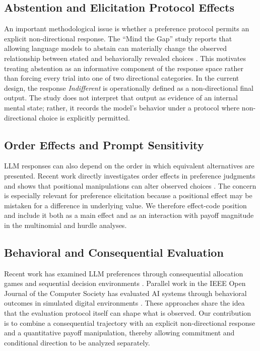 \documentclass[10pt,journal,compsoc]{IEEEtran}
\begin{document}
\subsection{Abstention and Elicitation Protocol Effects}
An important methodological issue is whether a preference protocol permits an explicit non-directional response. The ``Mind the Gap'' study reports that allowing language models to abstain can materially change the observed relationship between stated and behaviorally revealed choices \cite{mind_the_gap_2026}. This motivates treating abstention as an informative component of the response space rather than forcing every trial into one of two directional categories. In the current design, the response \textit{Indifferent} is operationally defined as a non-directional final output. The study does not interpret that output as evidence of an internal mental state; rather, it records the model's behavior under a protocol where non-directional choice is explicitly permitted.

\subsection{Order Effects and Prompt Sensitivity}
LLM responses can also depend on the order in which equivalent alternatives are presented. Recent work directly investigates order effects in preference judgments and shows that positional manipulations can alter observed choices \cite{fragile_preferences_2026}. The concern is especially relevant for preference elicitation because a positional effect may be mistaken for a difference in underlying value. We therefore effect-code position and include it both as a main effect and as an interaction with payoff magnitude in the multinomial and hurdle analyses.

\subsection{Behavioral and Consequential Evaluation}
Recent work has examined LLM preferences through consequential allocation games and sequential decision environments \cite{what_do_llms_want_2026,probing_preferences_2025}. Parallel work in the IEEE Open Journal of the Computer Society has evaluated AI systems through behavioral outcomes in simulated digital environments \cite{ojcs_nudge_2026}. These approaches share the idea that the evaluation protocol itself can shape what is observed. Our contribution is to combine a consequential trajectory with an explicit non-directional response and a quantitative payoff manipulation, thereby allowing commitment and conditional direction to be analyzed separately.
\end{document}

